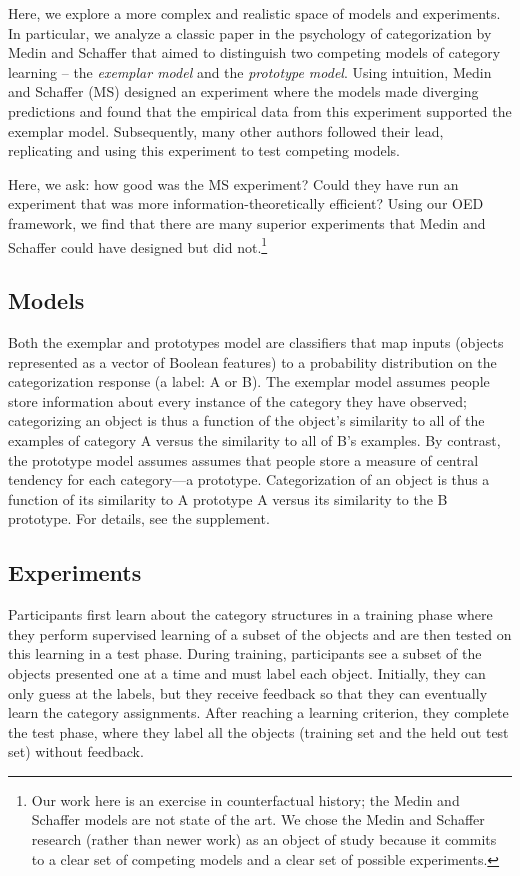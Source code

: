 \documentclass{article}
\begin{document}
Here, we explore a more complex and realistic space of models and experiments.
In particular, we analyze a classic paper in the psychology of categorization by Medin and Schaffer \cite{medin78:pr} that aimed to distinguish two competing models of category learning -- the \emph{exemplar model} and the \emph{prototype model}.
Using intuition, Medin and Schaffer (MS) designed an experiment where the models made diverging predictions and found that the empirical data from this experiment supported the exemplar model.
Subsequently, many other authors followed their lead, replicating and using this experiment to test competing models.

Here, we ask: how good was the MS experiment?
Could they have run an experiment that was more information-theoretically efficient?
Using our OED framework, we find that there are many superior experiments that Medin and Schaffer could have designed but did not.\footnote{Our work here is an exercise in counterfactual history; the Medin and Schaffer models are not state of the art. We chose the Medin and Schaffer research (rather than newer work) as an object of study because it commits to a clear set of competing models and a clear set of possible experiments.}



\subsection{Models}

Both the exemplar and prototypes model are classifiers that map inputs (objects represented as a vector of Boolean features) to a probability distribution on the categorization response (a label: A or B).
The exemplar model assumes people store information about every instance of the category they have observed; categorizing an object is thus a function of the object's similarity to all of the examples of category A versus the similarity to all of B's examples.
By contrast, the prototype model assumes assumes that people store a measure of central tendency for each category---a prototype.
Categorization of an object is thus a function of its similarity to A prototype  A versus its similarity to the B prototype.
For details, see the supplement.

\subsection{Experiments}

Participants first learn about the category structures in a training phase where they perform supervised learning of a subset of the objects and are then tested on this learning in a test phase.
During training, participants see a subset of the objects presented one at a time and must label each object.
Initially, they can only guess at the labels, but they receive feedback so that they can eventually learn the category assignments.
After reaching a learning criterion, they complete the test phase, where they label all the objects (training set and the held out test set) without feedback.
\end{document}
